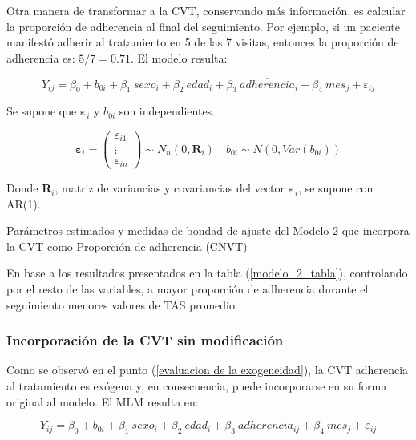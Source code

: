 \documentclass[spanish]{article}
\numberwithin{figure}{subsection}
\numberwithin{equation}{subsection}
\numberwithin{table}{subsection}
\begin{document}
Otra manera de transformar a la CVT, conservando más información, es calcular la
proporción de adherencia al final del seguimiento. Por ejemplo, si un paciente
manifestó adherir al tratamiento en 5 de las 7 visitas, entonces la proporción
de adherencia es: $5/7= 0.71$. El modelo resulta:

\begin{equation}
	\label{modelo_2}
	Y_{ij} = \beta_0 + b_{0i} + \beta_1\ sexo_i + \beta_2\ edad_i + \beta_3\ \overline{adherencia}_i
	+ \beta_4\ mes_j + \varepsilon_{ij}
\end{equation}

Se supone que $\bm{\varepsilon}_i$ y $b_{0i}$ son independientes.

\[ 
	\bm{\varepsilon}_i = \begin{pmatrix} \varepsilon_{i1} \\ \vdots \\ \varepsilon_{in} \end{pmatrix} \sim N_{n}(0, \bm{R}_i)
	\quad
	b_{0i} \sim N(0, Var(b_{0i}))
\]

Donde $\bm{R}_i$, matriz de variancias y covariancias del vector
$\bm{\varepsilon}_{i}$, se supone con AR(1).

\begin{table}[H]
	\centering
	\caption{Parámetros estimados y medidas de bondad de ajuste del Modelo 2 que incorpora la CVT como Proporción de adherencia (CNVT)}
	\label{modelo_2_tabla}
	
\end{table}

En base a los resultados presentados en la tabla (\ref{modelo_2_tabla}),
controlando por el resto de las variables, a mayor proporción de adherencia
durante el seguimiento menores valores de TAS promedio.

\subsubsection{Incorporación de la CVT sin modificación}

Como se observó en el punto (\ref{evaluacion de la exogeneidad}), la CVT
adherencia al tratamiento es exógena y, en consecuencia, puede incorporarse en
su forma original al modelo. El MLM resulta en:

\begin{equation}
	\label{modelo_3}
	Y_{ij} = \beta_0 + b_{0i} + \beta_1\ sexo_i + \beta_2\ edad_i + \beta_3\ adherencia_{ij}
	+ \beta_4\ mes_j + \varepsilon_{ij}
\end{equation}
\end{document}
